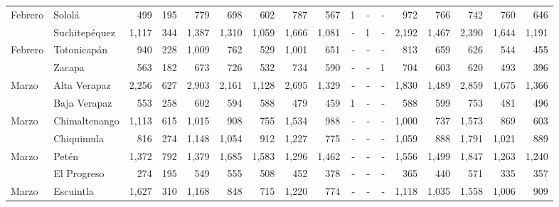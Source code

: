 \begin{landscape}
\begin{center}
\begin{longtable}{llrrrrrrrrrrrrrrr}
			\multicolumn{1}{l}{	\footnotesize	 Febrero 	}&	 Sololá 	&	 499 	&	 195 	&	 779 	&	 698 	&	 602 	&	 787 	&	 567 	&	 1 	&	 -   	&	 -   	&	 972 	&	 766 	&	 742 	&	 760 	&	 646 	\\
			\rowcolor{color1!5!white}\multicolumn{1}{l}{	\footnotesize	 Febrero 	}&	 Suchitepéquez 	&	 1,117 	&	 344 	&	 1,387 	&	 1,310 	&	 1,059 	&	 1,666 	&	 1,081 	&	 -   	&	 1 	&	 -   	&	 2,192 	&	 1,467 	&	 2,390 	&	 1,644 	&	 1,191 	\\
			\multicolumn{1}{l}{	\footnotesize	 Febrero 	}&	 Totonicapán 	&	 940 	&	 228 	&	 1,009 	&	 762 	&	 529 	&	 1,001 	&	 651 	&	 -   	&	 -   	&	 -   	&	 813 	&	 659 	&	 626 	&	 544 	&	 455 	\\
			\rowcolor{color1!5!white}\multicolumn{1}{l}{	\footnotesize	 Febrero 	}&	 Zacapa 	&	 563 	&	 182 	&	 673 	&	 726 	&	 532 	&	 734 	&	 590 	&	 -   	&	 -   	&	 1 	&	 704 	&	 603 	&	 620 	&	 493 	&	 396 	\\
			\multicolumn{1}{l}{	\footnotesize	 Marzo 	}&	 Alta Verapaz 	&	 2,256 	&	 627 	&	 2,903 	&	 2,161 	&	 1,128 	&	 2,695 	&	 1,329 	&	 -   	&	 -   	&	 -   	&	 1,830 	&	 1,489 	&	 2,859 	&	 1,675 	&	 1,366 	\\
			\rowcolor{color1!5!white}\multicolumn{1}{l}{	\footnotesize	 Marzo 	}&	 Baja Verapaz 	&	 553 	&	 258 	&	 602 	&	 594 	&	 588 	&	 479 	&	 459 	&	 1 	&	 -   	&	 -   	&	 588 	&	 599 	&	 753 	&	 481 	&	 496 	\\
			\multicolumn{1}{l}{	\footnotesize	 Marzo 	}&	 Chimaltenango 	&	 1,113 	&	 615 	&	 1,015 	&	 908 	&	 755 	&	 1,534 	&	 988 	&	 -   	&	 -   	&	 -   	&	 1,000 	&	 737 	&	 1,573 	&	 869 	&	 603 	\\
			\rowcolor{color1!5!white}\multicolumn{1}{l}{	\footnotesize	 Marzo 	}&	 Chiquimula 	&	 816 	&	 274 	&	 1,148 	&	 1,054 	&	 912 	&	 1,227 	&	 775 	&	 -   	&	 -   	&	 -   	&	 1,059 	&	 888 	&	 1,791 	&	 1,021 	&	 889 	\\
			\multicolumn{1}{l}{	\footnotesize	 Marzo 	}&	 Petén 	&	 1,372 	&	 792 	&	 1,379 	&	 1,685 	&	 1,583 	&	 1,296 	&	 1,462 	&	 -   	&	 -   	&	 -   	&	 1,556 	&	 1,499 	&	 1,847 	&	 1,263 	&	 1,240 	\\
			\rowcolor{color1!5!white}\multicolumn{1}{l}{	\footnotesize	 Marzo 	}&	 El Progreso 	&	 274 	&	 195 	&	 549 	&	 555 	&	 508 	&	 452 	&	 378 	&	 -   	&	 -   	&	 -   	&	 365 	&	 440 	&	 571 	&	 335 	&	 357 	\\
			\multicolumn{1}{l}{	\footnotesize	 Marzo 	}&	 Escuintla 	&	 1,627 	&	 310 	&	 1,168 	&	 848 	&	 715 	&	 1,220 	&	 774 	&	 -   	&	 -   	&	 -   	&	 1,118 	&	 1,035 	&	 1,558 	&	 1,006 	&	 909 	\\

\end{longtable}
\end{center}
\end{landscape}

